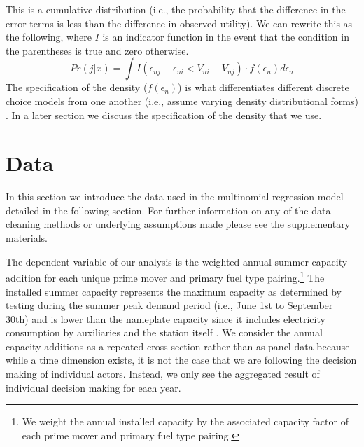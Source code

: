 \documentclass[10pt]{amsart}
\begin{document}
This is a cumulative distribution (i.e., the probability that the difference in the error terms is less than the difference in observed utility). 
We can rewrite this as the following, where $I$ is an indicator function in the event that the condition in the parentheses is true and zero otherwise.
\begin{equation}\label{equation:utility}	
Pr(j \vert x) = \int I(\epsilon_{nj} - \epsilon_{ni} < V_{ni} - V_{nj})\cdot f(\epsilon_{n}) d\epsilon_{n}
\end{equation}
The specification of the density ($f(\epsilon_{n})$) is what differentiates different discrete choice models from one another (i.e., assume varying density distributional forms) \parencite{train2009discrete}.
In a later section we discuss the specification of the density that we use. 

\section{Data}
In this section we introduce the data used in the multinomial regression model detailed in the following section.
For further information on any of the data cleaning methods or underlying assumptions made please see the supplementary materials. 

The dependent variable of our analysis is the weighted annual summer capacity addition for each unique prime mover and primary fuel type pairing.\footnote{We weight the annual installed capacity by the associated capacity factor of each prime mover and primary fuel type pairing.}
The installed summer capacity represents the maximum capacity as determined by testing during the summer peak demand period (i.e., June 1st to September 30th) and is lower than the nameplate capacity since it includes electricity consumption by auxiliaries and the station itself \parencite{eiaglossary2016}. 
We consider the annual capacity additions as a repeated cross section rather than as panel data because while a time dimension exists, it is not the case that we are following the decision making of individual actors.
Instead, we only see the aggregated result of individual decision making for each year.
\end{document}

